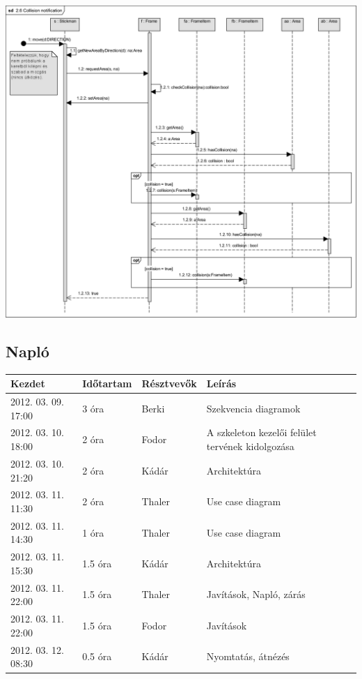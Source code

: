 		\begin{center}\includegraphics[scale=0.7, angle=-90]{resources/26Collisionnotification.png}\end{center}
	
	\subsection{Napló}
    \begin{center} 
        \begin{tabular}{| l | p{1.9cm} | p{2.6cm} | p{6.1cm} |}
            \hline
                Kezdet & Időtartam & Résztvevők & Leírás \\
            \hline \hline 
2012. 03. 09. 17:00 & 3 óra & Berki & Szekvencia diagramok\\ \hline
2012. 03. 10. 18:00 & 2 óra & Fodor & A szkeleton kezelői felület tervének kidolgozása\\ \hline
2012. 03. 10. 21:20 & 2 óra & Kádár & Architektúra\\ \hline
2012. 03. 11. 11:30 & 2 óra & Thaler & Use case diagram\\ \hline
2012. 03. 11. 14:30 & 1 óra & Thaler & Use case diagram\\ \hline
2012. 03. 11. 15:30 & 1.5 óra & Kádár & Architektúra\\ \hline
2012. 03. 11. 22:00 & 1.5 óra & Thaler & Javítások, Napló, zárás\\ \hline
2012. 03. 11. 22:00 & 1.5 óra & Fodor & Javítások\\ \hline
2012. 03. 12. 08:30 & 0.5 óra & Kádár & Nyomtatás, átnézés\\ \hline

            \hline
        \end{tabular}
    \end{center}

